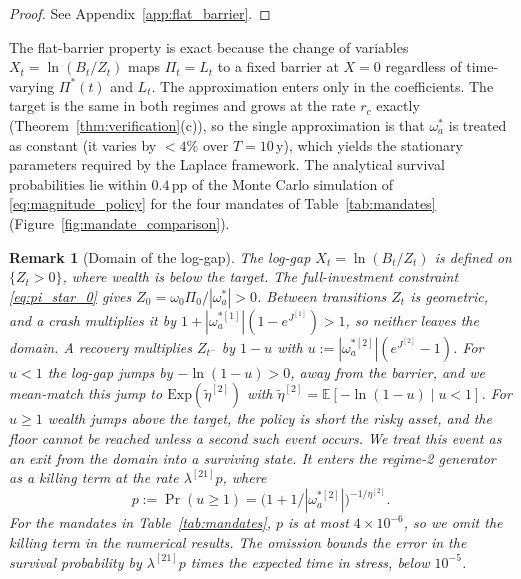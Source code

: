 \documentclass[11pt,a4paper]{article}
\numberwithin{equation}{section}
\newtheorem{remark}[theorem]{Remark}
\newcommand{\E}{\mathbb{E}}
\begin{document}
\begin{proof}
See Appendix~\ref{app:flat_barrier}.
\end{proof}

The flat-barrier property is exact because the change of variables 
$X_t = \ln(B_t/Z_t)$ maps $\Pi_t = L_t$ to a fixed barrier at $X = 0$ 
regardless of time-varying $\Pi^*(t)$ and $L_t$. The approximation 
enters only in the coefficients. The target is the same in both regimes 
and grows at the rate $r_c$ exactly (Theorem~\ref{thm:verification}(c)), 
so the single approximation is that $\omega^*_a$ is treated as 
constant (it varies by $< 4\%$ over $T = 10$\,y), which yields the 
stationary parameters required by the Laplace framework. 
The analytical survival probabilities lie within $0.4$\,pp of the 
Monte Carlo simulation of \eqref{eq:magnitude_policy} for the four 
mandates of Table~\ref{tab:mandates} (Figure~\ref{fig:mandate_comparison}).

\begin{remark}[Domain of the log-gap]\label{rem:gap_domain}
The log-gap $X_t = \ln(B_t/Z_t)$ is defined on $\{Z_t > 0\}$, where wealth is below the target. The full-investment constraint \eqref{eq:pi_star_0} gives $Z_0 = \omega_0 \Pi_0 / |\omega^*_a| > 0$. Between transitions $Z_t$ is geometric, and a crash multiplies it by $1 + |\omega^{*[1]}_a|(1 - e^{J^{[1]}}) > 1$, so neither leaves the domain. A recovery multiplies $Z_{t^-}$ by $1 - u$ with $u := |\omega^{*[2]}_a|(e^{J^{[2]}} - 1)$. For $u < 1$ the log-gap jumps by $-\ln(1 - u) > 0$, away from the barrier, and we mean-match this jump to $\mathrm{Exp}(\tilde\eta^{[2]})$ with $\tilde\eta^{[2]} = \E[-\ln(1 - u) \mid u < 1]$. For $u \geq 1$ wealth jumps above the target, the policy is short the risky asset, and the floor cannot be reached unless a second such event occurs. We treat this event as an exit from the domain into a surviving state. It enters the regime-2 generator as a killing term at the rate $\lambda^{[21]} p$, where
\begin{equation}\label{eq:p_exit}
p := \Pr(u \geq 1) = \big(1 + 1/|\omega^{*[2]}_a|\big)^{-1/\eta^{[2]}}.
\end{equation}
For the mandates in Table~\ref{tab:mandates}, $p$ is at most $4 \times 10^{-6}$, so we omit the killing term in the numerical results. The omission bounds the error in the survival probability by $\lambda^{[21]} p$ times the expected time in stress, below $10^{-5}$.
\end{remark}
\end{document}
